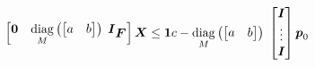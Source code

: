 \begin{equation*}
    \begin{bmatrix}
        \M{0} & \diag{M}{\begin{bmatrix} a & b \end{bmatrix}} \M{I}_{\FD}
    \end{bmatrix}
    \M{X}
    \le
    \M{1} c -
    \diag{M}{\begin{bmatrix} a & b \end{bmatrix}}
    \begin{bmatrix}
        \M{I} \\
        \vdots \\
        \M{I}\\
    \end{bmatrix} 
    \fp_0
\end{equation*}
